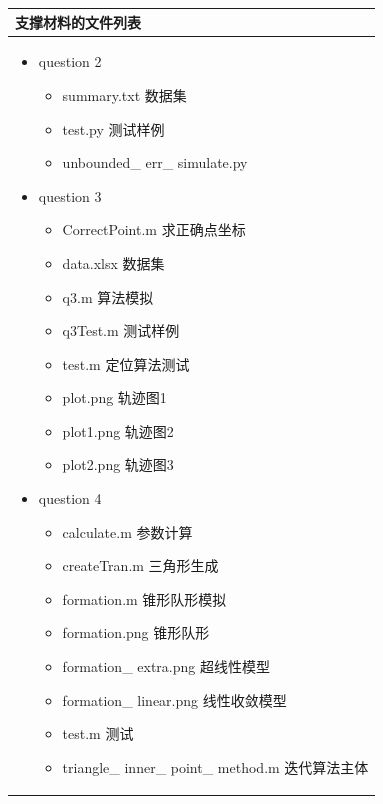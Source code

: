 \documentclass{my_paper}
\begin{document}
\newpage
\begin{table}[H]
    \centering
    \begin{tabular}{|p{14.0cm}|}
    \hline
    \textbf{支撑材料的文件列表} \\  
    \hline
    \begin{itemize}
        \item question 2
        \begin{itemize}
            \item summary.txt 数据集
            \item test.py 测试样例
            \item unbounded\_ err\_ simulate.py
        \end{itemize}
        \item question 3
        \begin{itemize}
            \item CorrectPoint.m 求正确点坐标
            \item data.xlsx 数据集
            \item q3.m 算法模拟
            \item q3Test.m 测试样例
            \item test.m 定位算法测试
            \item plot.png 轨迹图1
            \item plot1.png 轨迹图2
            \item plot2.png 轨迹图3
        \end{itemize}
        \item question 4
        \begin{itemize}
            \item calculate.m 参数计算
            \item createTran.m 三角形生成
            \item formation.m 锥形队形模拟
            \item formation.png 锥形队形
            \item formation\_ extra.png 超线性模型
            \item formation\_ linear.png 线性收敛模型
            \item test.m 测试
            \item triangle\_ inner\_ point\_ method.m 迭代算法主体
        \end{itemize}
    \end{itemize}
    \\
    \hline
    \end{tabular}
\end{table}
\end{document}
